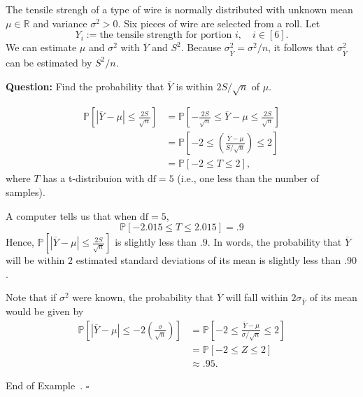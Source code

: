 \documentclass[10pt]{article}
\theoremstyle{definition}
\newtheorem{example}[theorem]{Example}
\renewenvironment{example}
{\begin{oldexample}}
  {\par\smallskip\hfill   End of Example~\theexample. $\square$    \par\end{oldexample}}
\newcommand{\vt}{\vskip 5mm} %
\newcommand{\Fl}{\vt\noindent\textbf} %
\newcommand{\1}[1]{\textbf{1}_{\left[#1\right]}} %
\def\R{\mathbb{R}} %
\def\P{\mathbb{P}} %
\begin{document}
\begin{example}[Example 7.6 in the textbook]
  \label{ex:example-7.6}
  The tensile strengh of a type of wire is normally distributed with unknown
  mean $\mu\in \R$ and variance $\sigma^{2}>0$. Six pieces of wire are
  selected from a roll. Let
  \begin{equation*}
    Y_{i} := \text{the tensile strength for portion }i, \quad i\in [6].
  \end{equation*}
  We can estimate $\mu$ and $\sigma^{2}$ with $\overline{Y}$ and $S^{2}$.
  Because $\sigma^{2}_{\overline{Y}}=\sigma^{2}/n$, it follows that
  $\sigma^{2}_{\overline{Y}}$ can be estimated by $S^{2}/n$.

  \Fl{Question:} Find the probability that $\overline{Y}$ is within
  $2S/\sqrt{n}$ of $\mu$.

  \begin{align*}
    \P\left[ \left| \overline{Y}-\mu \right| \leq \frac{2S}{\sqrt{n}}\right]
    &= \P\left[-\frac{2S}{\sqrt{n}}\leq  \overline{Y}-\mu \leq \frac{2S}{\sqrt{n}}\right]\\
    &= \P\left[-2 \leq  \left( \frac{\overline{Y}-\mu}{S/\sqrt{n}} \right) \leq 2\right]\\
    &= \P\left[-2 \leq T \leq  2\right],
  \end{align*}
  where $T$ has a t-distribuion with $\mathrm{df}=5$ (i.e., one less than the number
  of samples).

  A computer tells us that when $\mathrm{df}=5$,
  \begin{equation*}
    \P\left[-2.015 \leq T \leq  2.015\right] = .9
  \end{equation*}
  Hence, $\P\left[ \left| \overline{Y}-\mu \right| \leq
    \frac{2S}{\sqrt{n}}\right]$ is slightly less than $.9$.  In words, the
  probability that $\overline{Y}$ will be within 2 estimated standard
  deviations of its mean is slightly less than $.90$.

  Note that if $\sigma^{2}$ were known, the probability that $\overline{Y}$
  will fall within  $2\sigma_{\overline{Y}}$ of its mean would be given by
  \begin{align*}
    \P\left[ \left| \overline{Y}-\mu \right| \leq  -2 \left( \frac{\sigma}{\sqrt{n}} \right)\right] 
    &= \P\left[-2 \leq  \frac{\overline{Y}-\mu}{\sigma/\sqrt{n}} \leq 2\right]\\
    &= \P\left[-2 \leq Z \leq 2\right]\\
    &\approx .95.
\end{align*}
\end{example}
\end{document}
